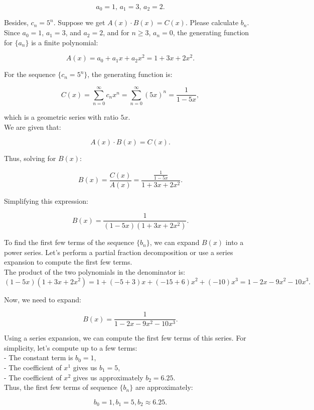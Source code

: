 \documentclass[12pt]{article}
\begin{document}
\[
a_0 = 1, \, a_1 = 3, \, a_2 = 2.
\]

Besides, \(c_n = 5^n\). Suppose we get \(A(x) \cdot B(x) = C(x)\). Please calculate \(b_n\).\\

Since \(a_0 = 1\), \(a_1 = 3\), and \(a_2 = 2\), and for \(n \geq 3\), \(a_n = 0\), the generating function for \(\{a_n\}\) is a finite polynomial:

\[
A(x) = a_0 + a_1 x + a_2 x^2 = 1 + 3x + 2x^2.
\]

For the sequence \(\{c_n = 5^n\}\), the generating function is:

\[
C(x) = \sum_{n=0}^{\infty} c_n x^n = \sum_{n=0}^{\infty} (5x)^n = \frac{1}{1 - 5x},
\]

which is a geometric series with ratio \(5x\).\\

We are given that:

\[
A(x) \cdot B(x) = C(x).
\]

Thus, solving for \(B(x)\):

\[
B(x) = \frac{C(x)}{A(x)} = \frac{\frac{1}{1 - 5x}}{1 + 3x + 2x^2}.
\]

Simplifying this expression:

\[
B(x) = \frac{1}{(1 - 5x)(1 + 3x + 2x^2)}.
\]

To find the first few terms of the sequence \(\{b_n\}\), we can expand \(B(x)\) into a power series. Let's perform a partial fraction decomposition or use a series expansion to compute the first few terms.\\

The product of the two polynomials in the denominator is:
\[
(1 - 5x)(1 + 3x + 2x^2) = 1 + (-5 + 3)x + (-15 + 6)x^2 + (-10)x^3 = 1 - 2x - 9x^2 - 10x^3.
\]

Now, we need to expand:

\[
B(x) = \frac{1}{1 - 2x - 9x^2 - 10x^3}.
\]

Using a series expansion, we can compute the first few terms of this series. For simplicity, let's compute up to a few terms:\\

- The constant term is \(b_0 = 1\),\\
- The coefficient of \(x^1\) gives us \(b_1 = 5\),\\
- The coefficient of \(x^2\) gives us approximately \(b_2 = 6.25.\)\\

Thus, the first few terms of sequence \(\{b_n\}\) are approximately:

\[ b_0 = 1, b_1 = 5, b_2 \approx 6.25. \]
\end{document}
